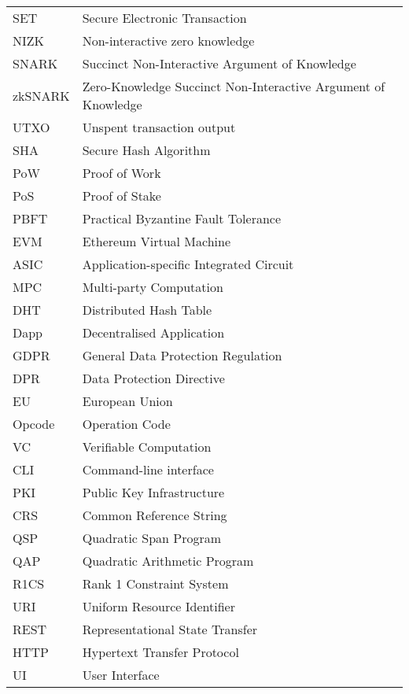 
\abbreviations
\begin{center}
	\renewcommand{\arraystretch}{1.5}
	\begin{longtable}{ l @{\qquad} l }
	\toprule
	SET    & Secure Electronic Transaction \\
	NIZK & Non-interactive zero knowledge \\
	SNARK & Succinct Non-Interactive Argument of Knowledge \\
	zkSNARK    & Zero-Knowledge Succinct Non-Interactive Argument of Knowledge \\
	UTXO    & Unspent transaction output \\
	SHA    & Secure Hash Algorithm \\
	PoW    & Proof of Work \\
	PoS    & Proof of Stake \\
	PBFT    & Practical Byzantine Fault Tolerance \\
	EVM    & Ethereum Virtual Machine \\
	ASIC    & Application-specific Integrated Circuit \\
	MPC    & Multi-party Computation \\
	DHT    & Distributed Hash Table \\
	Dapp    & Decentralised Application \\
	GDPR    & General Data Protection Regulation \\
	DPR    & Data Protection Directive \\
	EU    & European Union \\
	Opcode    & Operation Code \\
	VC    & Verifiable Computation \\
	CLI    & Command-line interface \\
	PKI    & Public Key Infrastructure \\
	CRS    & Common Reference String \\
	QSP    & Quadratic Span Program \\
	QAP    & Quadratic Arithmetic Program \\
	R1CS    & Rank 1 Constraint System \\
	URI    & Uniform Resource Identifier \\
	REST    & Representational State Transfer \\
	HTTP    & Hypertext Transfer Protocol \\
	UI    & User Interface \\

\end{longtable}
\end{center}

